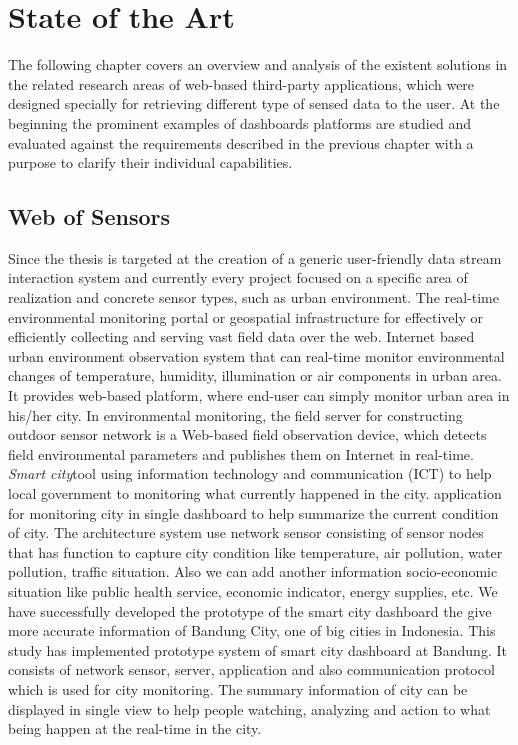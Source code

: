 \chapter{State of the Art}
The following chapter covers an overview and analysis of the existent solutions in
the related research areas of web-based third-party applications, which were designed specially for retrieving different type of sensed data to the user. At the beginning the prominent examples of dashboards platforms are studied and evaluated against the requirements described in the previous chapter with a purpose to clarify their individual capabilities.

\section{Web of Sensors}
 Since the thesis is targeted at the creation of a generic user-friendly data stream interaction system and currently every project focused on a specific area of realization and concrete sensor types, such as urban environment\cite{song2010real}. The real-time environmental monitoring portal or geospatial infrastructure for effectively or  efficiently collecting and serving vast field data over the web. Internet based urban environment observation system that can real-time monitor environmental changes of temperature, humidity, illumination or air components in urban area. It provides web-based platform, where end-user can simply monitor urban area in his/her city. In environmental monitoring, the field server for constructing outdoor sensor network is a Web-based field observation device, which detects field environmental parameters and publishes them on Internet in real-time.
\newline
	\emph{Smart city}\cite{6588063}tool using information technology and communication (ICT) to help local government to monitoring what currently happened in the city. application for monitoring city in single dashboard to help summarize the current condition of city. The architecture system use network sensor consisting of sensor nodes that has function to capture city condition like temperature, air pollution, water pollution, traffic situation. Also we can add another information socio-economic situation like public health service, economic indicator, energy supplies, etc. We have successfully developed the prototype of the smart city dashboard the give more accurate information of Bandung City, one of big cities in Indonesia. This study has implemented prototype system of smart city dashboard at Bandung. It consists of network sensor, server, application and also communication protocol which is used for city monitoring. The summary information of city can be displayed in single view to help people watching, analyzing and action to what being happen at the real-time in the city.
